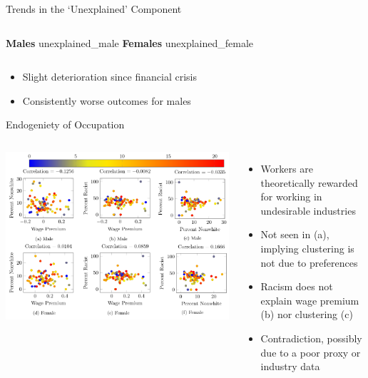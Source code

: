\documentclass[aspectratio=169,12pt]{beamer}
\begin{document}
\begin{frame}{Trends in the \enquote*{Unexplained} Component}
    \begin{columns}
        \vspace{5pt}
        \textbf{Males}
		{unexplained_male}
	    \vspace{-2pt}
	    \textbf{Females}
		{unexplained_female}
	\end{columns}
	\begin{itemize}
	    \item Slight deterioration since financial crisis
	    \item Consistently worse outcomes for males
	\end{itemize}
\end{frame}

\begin{frame}{Endogeniety of Occupation}
    \begin{columns}
        \includegraphics[width=1.1\textwidth]{beamer/cross-correls.png}
	    \hspace{-20pt}
	    \begin{itemize}
	    \vspace{-20pt}
	    \item Workers are theoretically rewarded for working in undesirable industries
	    \item Not seen in (a), implying clustering is not due to preferences
	    \item Racism does not explain wage premium (b) nor clustering (c)
	    \item Contradiction, possibly due to a poor proxy or industry data
	    \end{itemize}
	\end{columns}
	
\end{frame}
\end{document}
